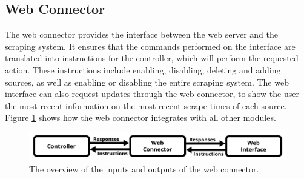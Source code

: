 \documentclass{l4proj}
\begin{document}
\subsection{Web Connector}
The web connector provides the interface between the web server and the scraping system. It ensures that the commands performed on the interface are translated into instructions for the controller, which will perform the requested action. These instructions include enabling, disabling, deleting and adding sources, as well as enabling or disabling the entire scraping system. The web interface can also request updates through the web connector, to show the user the most recent information on the most recent scrape times of each source. Figure \ref{fig:web-connector-diagram} shows how the web connector integrates with all other modules.
 \begin{figure}[h]
\centering
\includegraphics[width=\textwidth]{images/Web-connector-diagram.png}
\caption{The overview of the inputs and outputs of the web connector.}
\label{fig:web-connector-diagram}
\end{figure}
\end{document}
